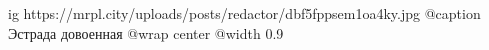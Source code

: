  
 
 
 
 

\ifcmt
  ig https://mrpl.city/uploads/posts/redactor/dbf5fppsem1oa4ky.jpg
	@caption Эстрада довоенная
  @wrap center
  @width 0.9
\fi
